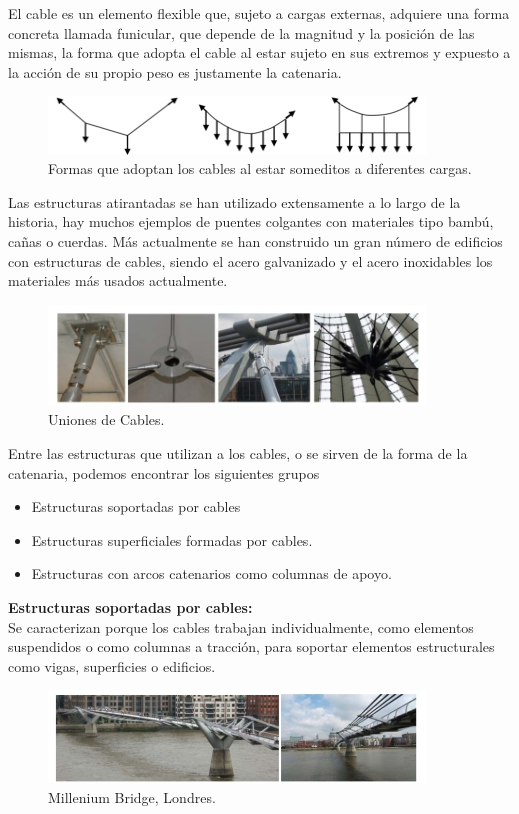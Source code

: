 El cable es un elemento flexible que, sujeto a cargas externas, adquiere una forma concreta llamada funicular, que depende de la magnitud y la posición de las mismas, la forma que adopta el cable al estar sujeto en sus extremos y expuesto a la acción de su propio peso es justamente la catenaria.
\begin{figure}[h]            \includegraphics[width=10cm]{Imagenes/FormasCat.jpg}
    \caption{Formas que adoptan los cables al estar someditos a diferentes cargas.}
    \centering
\end{figure}

\framebreak
Las estructuras atirantadas se han utilizado extensamente a lo largo de la historia, hay muchos ejemplos de puentes colgantes con materiales tipo bambú, cañas o cuerdas. Más actualmente se han construido un gran número de edificios con estructuras de cables, siendo el acero galvanizado y el acero inoxidables los materiales más usados actualmente.
      \begin{figure}[h]
        \includegraphics[width=10cm]{Imagenes/UnionesCat.jpg}
        \caption{Uniones de Cables.}
                \centering
            \end{figure}

\framebreak
Entre las estructuras que utilizan a los cables, o se sirven de la forma de la catenaria, podemos encontrar los siguientes grupos
\begin{itemize}
    \item Estructuras soportadas por cables
    \item Estructuras superficiales formadas por cables.
    \item Estructuras con arcos catenarios como columnas de apoyo.
\end{itemize}
\framebreak
\textbf{Estructuras  soportadas por cables:}
\\Se caracterizan porque los cables trabajan individualmente, como elementos suspendidos o como columnas a tracción, para soportar elementos estructurales como vigas, superficies o edificios.
    \begin{figure}[h]
       \includegraphics[width=10cm]{Imagenes/Mill Lon.jpg}
            \centering
            \caption{Millenium Bridge, Londres.}
    \end{figure}

